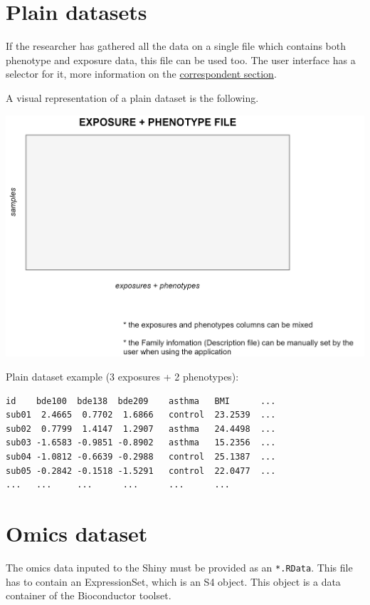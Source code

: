 \documentclass[
]{book}
\begin{document}
\hypertarget{plain-datasets}{%
\section{Plain datasets}\label{plain-datasets}}

If the researcher has gathered all the data on a single file which contains both phenotype and exposure data, this file can be used too. The user interface has a selector for it, more information on the \protect\hyperlink{plain_data}{correspondent section}.

A visual representation of a plain dataset is the following.

\includegraphics{images/plain_tables.png}

Plain dataset example (3 exposures + 2 phenotypes):

\begin{verbatim}
id    bde100  bde138  bde209    asthma   BMI      ...
sub01  2.4665  0.7702  1.6866   control  23.2539  ...
sub02  0.7799  1.4147  1.2907   asthma   24.4498  ...  
sub03 -1.6583 -0.9851 -0.8902   asthma   15.2356  ... 
sub04 -1.0812 -0.6639 -0.2988   control  25.1387  ... 
sub05 -0.2842 -0.1518 -1.5291   control  22.0477  ...
...   ...     ...      ...      ...      ...
\end{verbatim}

\hypertarget{omicsds}{%
\section{Omics dataset}\label{omicsds}}

The omics data inputed to the Shiny must be provided as an \texttt{*.RData}. This file has to contain an ExpressionSet, which is an S4 object. This object is a data container of the Bioconductor toolset.
\end{document}
